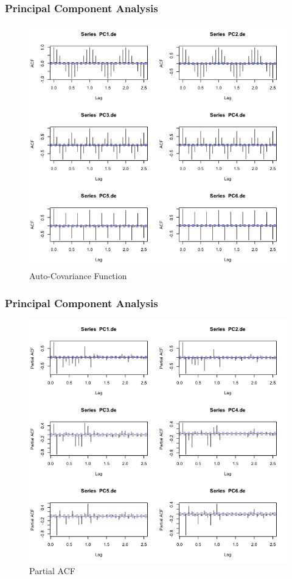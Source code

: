 \documentclass{beamer}
\begin{document}
\begin{frame}
\frametitle{Principal Component Analysis}
\begin{figure}
\centering
\includegraphics[width=0.7\linewidth]{../img/PCAde_ACF}
\caption{Auto-Covariance Function}
\label{fig:pcadeacf}
\end{figure}
\end{frame}

\begin{frame}
\frametitle{Principal Component Analysis}
\begin{figure}
\centering
\includegraphics[width=0.7\linewidth]{../img/PCAde_pacf}
\caption{Partial ACF}
\label{fig:pcadpeacf}
\end{figure}
\end{frame}
\end{document}
